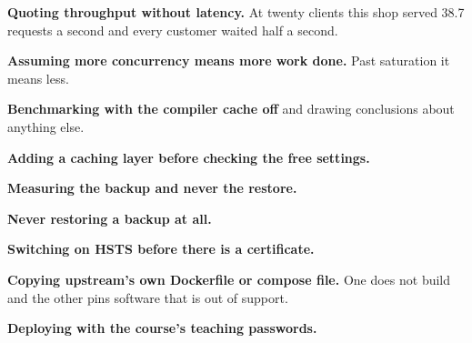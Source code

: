 \begin{pitfall}
\begin{tight}
  \item \textbf{Quoting throughput without latency.} At twenty clients this
        shop served 38.7 requests a second and every customer waited half a
        second.
  \item \textbf{Assuming more concurrency means more work done.} Past
        saturation it means less.
  \item \textbf{Benchmarking with the compiler cache off} and drawing
        conclusions about anything else.
  \item \textbf{Adding a caching layer before checking the free settings.}
  \item \textbf{Measuring the backup and never the restore.}
  \item \textbf{Never restoring a backup at all.}
  \item \textbf{Switching on HSTS before there is a certificate.}
  \item \textbf{Copying upstream's own Dockerfile or compose file.} One does not
        build and the other pins software that is out of support.
  \item \textbf{Deploying with the course's teaching passwords.}
\end{tight}
\end{pitfall}

